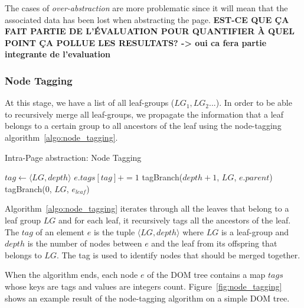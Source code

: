 \documentclass[sigconf,authordraft]{acmart}
\theoremstyle{definition}
\begin{document}
The cases of \emph{over-abstraction} are more problematic since it will mean that the associated data has been lost when abstracting the page.
\textbf{EST-CE QUE ÇA FAIT PARTIE DE L'ÉVALUATION POUR QUANTIFIER À QUEL POINT ÇA POLLUE LES RESULTATS? -> oui ca fera partie integrante de l'evaluation}

\subsubsection{Node Tagging}
\label{sec:node_tagging}
At this stage, we have a list of all leaf-groups ($LG_1, LG_2...$). 
In order to be able to recursively merge all leaf-groups, we propagate the information that a leaf belongs to a certain group to all ancestors of the leaf using the node-tagging algorithm~\ref{algo:node_tagging}.

\begin{algorithm}
\caption{Intra-Page abstraction: Node Tagging}\label{alg:intra_tagging}
\begin{algorithmic}[1]
      \State $tag \gets \langle LG, depth \rangle$
      \State $e.tags[tag] += 1$ 
      \State tagBranch($depth + 1$, $LG$, $e.parent$)
    \EndFunction
        \State tagBranch(0, $LG$, $e_{leaf}$) 
      \EndFor
    \EndFor
  \EndFunction
\end{algorithmic}
\label{algo:node_tagging}
\end{algorithm}

Algorithm~\ref{algo:node_tagging} iterates through all the leaves that belong to a leaf group $LG$ and for each leaf, it recursively tags all the ancestors of the leaf. 
The $tag$ of an element $e$ is the tuple $\langle LG, depth \rangle$ where $LG$ is a leaf-group and $depth$ is the number of nodes between $e$ and the leaf from its offspring that belongs to $LG$.
The tag is used to identify nodes that should be merged together.

When the algorithm ends, each node $e$ of the DOM tree contains a map $tags$ whose keys are tags and values are integers count. 
Figure~\ref{fig:node_tagging} shows an example result of the node-tagging algorithm on a simple DOM tree. 
\end{document}
